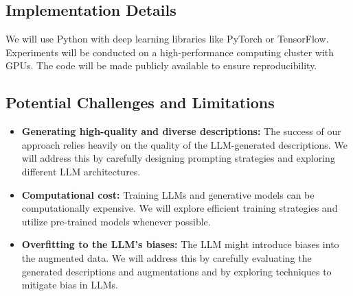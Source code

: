 \subsection{Implementation Details}

We will use Python with deep learning libraries like PyTorch or TensorFlow. Experiments will be conducted on a high-performance computing cluster with GPUs. The code will be made publicly available to ensure reproducibility.

\subsection{ Potential Challenges and Limitations}
\begin{itemize}[wide, labelindent=20pt] 
    \item \textbf{Generating high-quality and diverse descriptions:} The success of our approach relies heavily on the quality of the LLM-generated descriptions. We will address this by carefully designing prompting strategies and exploring different LLM architectures.

    \item \textbf{Computational cost:} Training LLMs and generative models can be computationally expensive. We will explore efficient training strategies and utilize pre-trained models whenever possible.
    \item \textbf{Overfitting to the LLM's biases:} The LLM might introduce biases into the augmented data. We will address this by carefully evaluating the generated descriptions and augmentations and by exploring techniques to mitigate bias in LLMs.
\end{itemize}